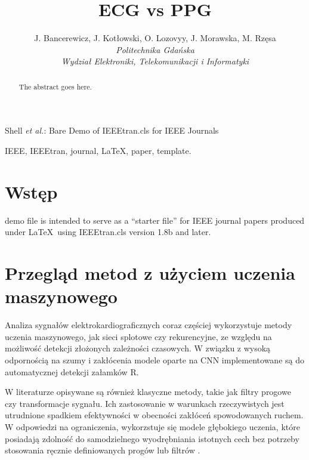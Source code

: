 \documentclass[journal]{IEEEtran}
\begin{document}
\title{ECG vs PPG}
\author{
    J. Bancerewicz, J. Kotłowski, O. Lozovyy, J. Morawska, M. Rzęsa\\
    \textit{Politechnika Gdańska}\\
    \textit{Wydział Elektroniki, Telekomunikacji i Informatyki}
}


\markboth{}%
{Shell \MakeLowercase{\textit{et al.}}: Bare Demo of IEEEtran.cls for IEEE Journals}
\maketitle

\begin{abstract}
The abstract goes here.
\end{abstract}

\begin{IEEEkeywords}
IEEE, IEEEtran, journal, \LaTeX, paper, template.
\end{IEEEkeywords}

\IEEEpeerreviewmaketitle



\section{Wstęp}

 demo file is intended to serve as a ``starter file''
for IEEE journal papers produced under \LaTeX\ using
IEEEtran.cls version 1.8b and later.

\newpage
\section{Przegląd metod z użyciem uczenia maszynowego}
Analiza sygnałów elektrokardiograficznych coraz częściej wykorzystuje metody uczenia maszynowego, jak sieci splotowe czy rekurencyjne, ze względu na możliwość detekcji złożonych zależności czasowych. W związku z wysoką odpornością na szumy i zakłócenia modele oparte na CNN implementowane są do automatycznej detekcji załamków R. 

W literaturze opisywane są również klasyczne metody, takie jak filtry progowe czy transformacje sygnału. Ich zastosowanie w warunkach rzeczywistych jest utrudnione spadkiem efektywności w obecności zakłóceń spowodowanych ruchem. W odpowiedzi na ograniczenia, wykorzstuje się modele głębokiego uczenia, które posiadają zdolność do samodzielnego wyodrębniania istotnych cech bez potrzeby stosowania ręcznie definiowanych progów lub filtrów \cite{1}.
\end{document}
